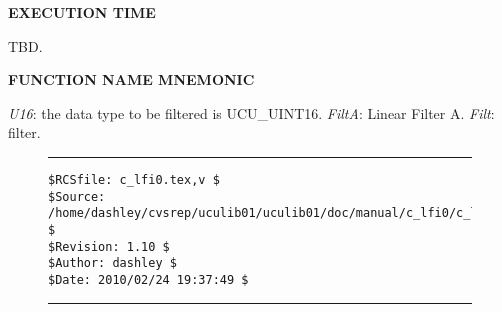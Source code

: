 \noindent\textbf{EXECUTION TIME}
\begin{list}{}{\setlength{\leftmargin}{0.25in}\setlength{\topsep}{0.0in}}
\item TBD.
\end{list}
\vspace{2.8ex}

\noindent\textbf{FUNCTION NAME MNEMONIC}
\begin{list}{}{\setlength{\leftmargin}{0.25in}\setlength{\topsep}{0.0in}}
\item \emph{U16}:    the data type to be filtered is UCU\_UINT16.
      \emph{FiltA}:  Linear Filter A.
      \emph{Filt}:   filter.
\end{list}


\noindent\begin{figure}[!b]
\noindent\rule[-0.25in]{\textwidth}{1pt}
\begin{tiny}
\begin{verbatim}
$RCSfile: c_lfi0.tex,v $
$Source: /home/dashley/cvsrep/uculib01/uculib01/doc/manual/c_lfi0/c_lfi0.tex,v $
$Revision: 1.10 $
$Author: dashley $
$Date: 2010/02/24 19:37:49 $
\end{verbatim}
\end{tiny}
\noindent\rule[0.25in]{\textwidth}{1pt}
\end{figure}

%
%
%
%
%
%
%
%
%

